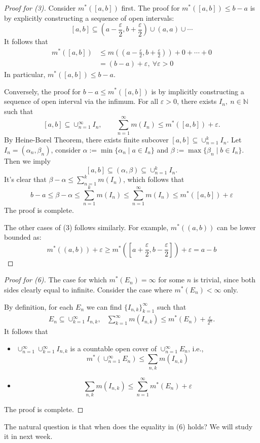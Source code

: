 \begin{proof}[Proof for (3)]
Consider $m^*([a,b])$ first. The proof for $m^*([a,b])\le b-a$ is by explicitly constructing a sequence of open intervals:
\[
[a,b]\subseteq(a-\frac{\varepsilon}{2},b+\frac{\varepsilon}{2})\cup(a,a)\cup\cdots
\]
It follows that 
\begin{align*}
m^*([a,b])&\le m((a-\frac{\varepsilon}{2},b+\frac{\varepsilon}{2}))+0+\cdots+0\\&=(b-a)+\varepsilon,\ \forall\varepsilon>0
\end{align*}
In particular, $m^*([a,b])\le b-a$.

Conversely, the proof for $b-a\le m^*([a,b])$ is by implicitly constructing a sequence of open interval via the infimum. For all $\varepsilon>0$, there exists $I_n, \ n\in\mathbb{N}$ such that
\[
[a,b]\subseteq \cup_{n=1}^\infty I_n,\qquad
\sum_{n=1}^\infty m(I_n)\le m^*([a,b])+\varepsilon.
\]
By Heine-Borel Theorem, there exists finite subcover 
$[a,b]\subseteq \cup_{n=1}^k I_n$.
Let $I_n = (\alpha_n,\beta_n)$, consider $\alpha:=\min\{\alpha_n\mid a\in I_n\}$ and $\beta:=\max\{\beta_n\mid b\in I_n\}$.
Then we imply 
\[
[a,b]\subseteq(\alpha,\beta)\subseteq \cup_{n=1}^kI_n.
\]
It's clear that $\beta - \alpha\le \sum_{n=1}^km(I_n)$, which follows that
\[
b-a\le \beta-\alpha\le \sum_{n=1}^km(I_n)\le\sum_{n=1}^\infty m(I_n)\le m^*([a,b])+\varepsilon
\]
The proof is complete.

The other cases of (3) follows similarly. For example, $m^*((a,b))$ can be lower bounded as: 
\[
m^*((a,b))+\varepsilon\ge m^*([a+\frac{\varepsilon}{2},b-\frac{\varepsilon}{2}])+\varepsilon=a-b
\]
\end{proof}
\begin{proof}[Proof for (6)]
The case for which $m^*(E_n)=\infty$ for some $n$ is trivial, since both sides clearly equal to infinite.
Consider the case where $m^*(E_n)<\infty$ only.

By definition, for each $E_n$ we can find $\{I_{n,k}\}_{k=1}^\infty$ such that 
\[
\begin{array}{ll}
E_n\subseteq\cup_{k=1}^\infty I_{n,k},
&
\sum_{k=1}^\infty m(I_{n,k})\le m^*(E_n) + \frac{\varepsilon}{2^n}.
\end{array}
\]
It follows that
\begin{itemize}
\item
$\cup_{n=1}^\infty\cup_{k=1}^\infty I_{n,k}$ is a countable open cover of $\cup_{n=1}^\infty E_n$, i.e.,
\[
m^*(\cup_{n=1}^\infty E_n)\le \sum_{n,k}m(I_{n,k})
\]
\item
\[
\sum_{n,k}m(I_{n,k})\le \sum_{n=1}^\infty m^*(E_n)+\varepsilon
\]
\end{itemize}
The proof is complete.
\end{proof}
The natural question is that when does the equality in (6) holds? 
We will study it in next week. 

